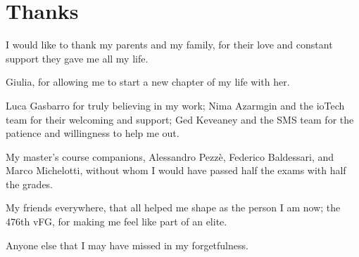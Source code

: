 
\chapter*{Thanks}

I would like to thank my parents and my family, for their love and constant support they gave me all my life.

\FLOATverticalspace{12px}

Giulia, for allowing me to start a new chapter of my life with her.

\FLOATverticalspace{12px}

Luca Gasbarro for truly believing in my work; Nima Azarmgin and the ioTech team for their welcoming and support; Ged Keveaney and the SMS team for the patience and willingness to help me out. %

\FLOATverticalspace{12px}

My master's course companions, Alessandro Pezzè, Federico Baldessari, and Marco Michelotti, without whom I would have passed half the exams with half the grades. %

\FLOATverticalspace{12px}

My friends everywhere, that all helped me shape as the person I am now; the 476th vFG, for making me feel like part of an elite.

\FLOATverticalspace{12px}

Anyone else that I may have missed in my forgetfulness.
